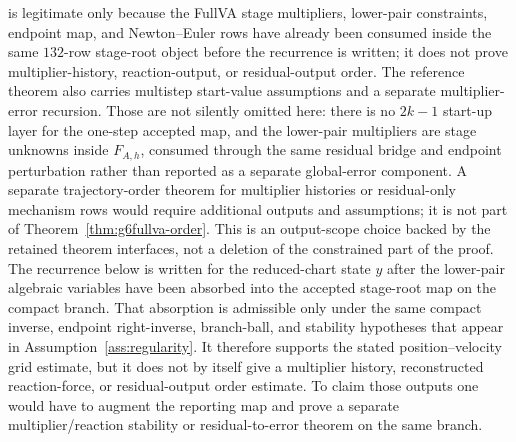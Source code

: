 \documentclass[preprint,12pt]{elsarticle}
\begin{document}
is legitimate only because the FullVA stage multipliers, lower-pair
constraints, endpoint map, and Newton--Euler rows have already been consumed
inside the same \(132\)-row stage-root object before the recurrence is
written; it does not prove multiplier-history, reaction-output, or
residual-output order.
The reference theorem also carries multistep start-value assumptions and a
separate multiplier-error recursion. Those are not silently omitted here:
there is no \(2k-1\) start-up layer for the one-step accepted map, and the
lower-pair multipliers are stage unknowns inside \(F_{A,h}\), consumed through
the same residual bridge and endpoint perturbation rather than reported as a
separate global-error component. A separate trajectory-order theorem for
multiplier histories or residual-only mechanism rows would require additional
outputs and assumptions; it is not part of
Theorem~\ref{thm:g6fullva-order}.
This is an output-scope choice backed by the retained theorem interfaces, not
a deletion of the constrained part of the proof.  The recurrence below is
written for the reduced-chart state \(y\) after the lower-pair algebraic
variables have been absorbed into the accepted stage-root map on the compact
branch.  That absorption is admissible only under the same compact inverse,
endpoint right-inverse, branch-ball, and stability hypotheses that appear in
Assumption~\ref{ass:regularity}.  It therefore supports the stated
position--velocity grid estimate, but it does not by itself give a multiplier
history, reconstructed reaction-force, or residual-output order estimate.  To
claim those outputs one would have to augment the reporting map and prove a
separate multiplier/reaction stability or residual-to-error theorem on the
same branch.
\end{document}

